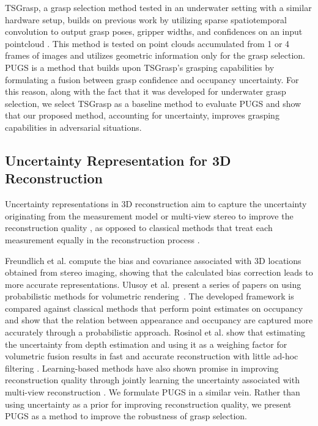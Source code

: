 TSGrasp, a grasp selection method tested in an underwater setting with a similar hardware setup, builds on previous work \cite{mousavian_6-dof_2019} by utilizing sparse spatiotemporal convolution to output grasp poses, gripper widths, and confidences on an input pointcloud \cite{player_real-time_2023}.
This method is tested on point clouds accumulated from 1 or 4 frames of images and utilizes geometric information only for the grasp selection.
PUGS is a method that builds upon TSGrasp's grasping capabilities by formulating a fusion between grasp confidence and occupancy uncertainty.
For this reason, along with the fact that it was developed for underwater grasp selection, we select TSGrasp as a baseline method to evaluate PUGS and show that our proposed method, accounting for uncertainty, improves grasping capabilities in adversarial situations.


\subsection{Uncertainty Representation for 3D Reconstruction}
Uncertainty representations in 3D reconstruction aim to capture the uncertainty originating from the measurement model or multi-view stereo to improve the reconstruction quality \cite{freundlich_exact_2015, ulusoy_towards_2015, ulusoy_patches_2016, rosinol_probabilistic_2022, liao_multi-view_2024}, as opposed to classical methods that treat each measurement equally in the reconstruction process \cite{labbe2019rtab}.

Freundlich et al. compute the bias and covariance associated with 3D locations obtained from stereo imaging, showing that the calculated bias correction leads to more accurate representations\cite{freundlich_exact_2015}.
Ulusoy et al. present a series of papers on using probabilistic methods for volumetric rendering~\cite{ulusoy_towards_2015,ulusoy_patches_2016}.
The developed framework is compared against classical methods that perform point estimates on occupancy and show that the relation between appearance and occupancy are captured more accurately through a probabilistic approach.
Rosinol et al. show that estimating the uncertainty from depth estimation and using it as a weighing factor for volumetric fusion results in fast and accurate reconstruction with little ad-hoc filtering \cite{rosinol_probabilistic_2022}.
Learning-based methods have also shown promise in improving reconstruction quality through jointly learning the uncertainty associated with multi-view reconstruction \cite{liao_multi-view_2024}.
We formulate PUGS in a similar vein.
Rather than using uncertainty as a prior for improving reconstruction quality, we present PUGS as a method to improve the robustness of grasp selection.


